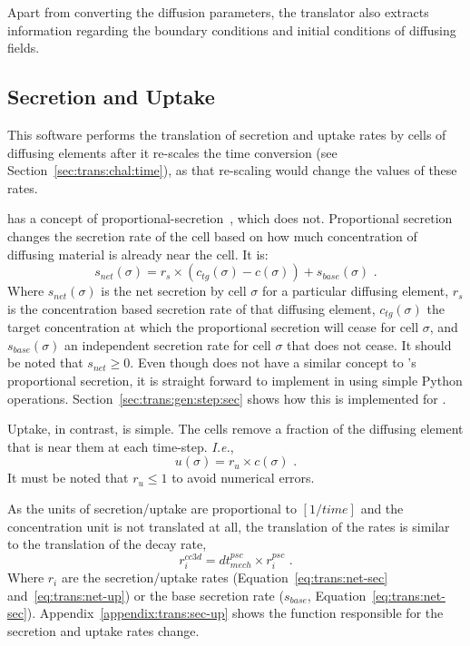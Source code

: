 Apart from converting the diffusion parameters, the translator also extracts information regarding the boundary conditions and initial conditions of diffusing fields.

\subsection{Secretion and Uptake}\label{sec:trans:impl:sec-upt}

This software performs the translation of secretion and uptake rates by cells of diffusing elements after it re-scales the time conversion (see Section~\ref{sec:trans:chal:time}), as that re-scaling would change the values of these rates. 

\pscs has a concept of proportional-secretion~\cite{ghaffarizadeh_physicell_2018}, which \ccds does not. Proportional secretion changes the secretion rate of the cell based on how much concentration of diffusing material is already near the cell. It is: 
\begin{equation}\label{eq:trans:net-sec}
    s_{net}(\sigma) = r_s \times \left(c_{tg}(\sigma) - c(\sigma) \right) + s_{base}(\sigma)\,\,.
\end{equation}
\noindent Where $s_{net}(\sigma)$ is the net secretion by cell $\sigma$ for a particular diffusing element, $r_s$ is the concentration based secretion rate of that diffusing element, $c_{tg}(\sigma)$ the target concentration at which the proportional secretion will cease for cell $\sigma$, and $s_{base}(\sigma)$ an independent secretion rate for cell $\sigma$ that does not cease. 
It should be noted that $s_{net}\geq0$.
Even though \ccds does not have a similar concept to \psc's proportional secretion, it is straight forward to implement in \ccd using simple Python operations. Section~\ref{sec:trans:gen:step:sec} shows how this is implemented for \ccd.

Uptake, in contrast, is simple. The cells remove a fraction of the diffusing element that is near them at each time-step. \textit{I.e.},
\begin{equation}\label{eq:trans:net-up}
    u(\sigma) = r_u \times c(\sigma)\,\,.
\end{equation}
\noindent It must be noted that $r_u\leq1$ to avoid numerical errors.

As the units of secretion/uptake are proportional to $\left[1/time\right]$ and the concentration unit is not translated at all, the translation of the rates is similar to the translation of the decay rate, 
\begin{equation}\label{eq:trans:sec-upt}
    r^{cc3d}_i = dt^{psc}_{mech} \times r^{psc}_i\,\,.
\end{equation}
\noindent Where $r_i$ are the secretion/uptake rates (Equation~\ref{eq:trans:net-sec} and~\ref{eq:trans:net-up}) or the base secretion rate ($s_{base}$, Equation~\ref{eq:trans:net-sec}). Appendix~\ref{appendix:trans:sec-up} shows the function responsible for the secretion and uptake rates change.

